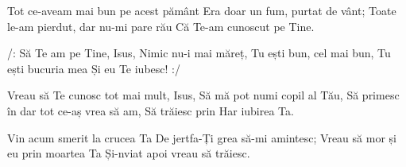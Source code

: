 \beginverse
Tot ce-aveam mai bun pe acest pământ
Era doar un fum, purtat de vânt;
Toate le-am pierdut, dar nu-mi pare rău
Că Te-am cunoscut pe Tine.
\endverse

\beginchorus
/: Să Te am pe Tine, Isus,
Nimic nu-i mai măreț,
Tu ești bun, cel mai bun,
Tu ești bucuria mea
Și eu Te iubesc! :/
\endchorus

\beginverse
Vreau să Te cunosc tot mai mult, Isus,
Să mă pot numi copil al Tău,
Să primesc în dar tot ce-aș vrea să am,
Să trăiesc prin Har iubirea Ta.
\endverse

\beginverse
Vin acum smerit la crucea Ta
De jertfa-Ți grea să-mi amintesc;
Vreau să mor și eu prin moartea Ta
Și-nviat apoi vreau să trăiesc.
\endverse
\endsong